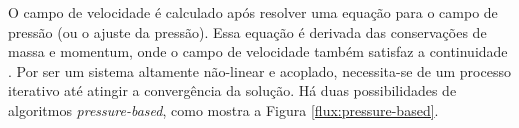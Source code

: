 O campo de velocidade é calculado após resolver uma equação para o campo de pressão (ou o ajuste da pressão). Essa equação é derivada das conservações de massa e momentum, onde o campo de velocidade também satisfaz a continuidade \cite{Chorin68}. Por ser um sistema altamente não-linear e acoplado, necessita-se de um processo iterativo até atingir a convergência da solução. Há duas possibilidades de algoritmos \textit{pressure-based}, como mostra a Figura \ref{flux:pressure-based}. 

\begin{figure}[!ht]
\centering
{} %

\begin{tikzpicture}[x=0.75pt,y=0.75pt,yscale=-1,xscale=1]


\end{tikzpicture}
\end{figure}
